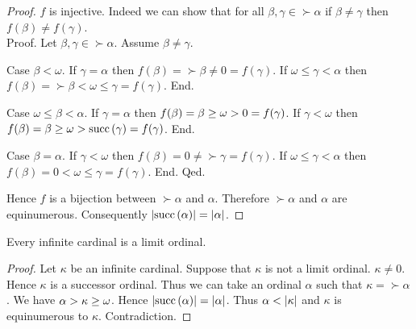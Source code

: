 \documentclass[../set-theory.tex]{subfiles}
\begin{document}
\begin{forthel}
\begin{proof}
      $f$ is injective.
      Indeed we can show that for all $\beta, \gamma \in \succ{\alpha}$ if
      $\beta \neq \gamma$ then $f(\beta) \neq f(\gamma)$. \\
      Proof.
        Let $\beta, \gamma \in \succ{\alpha}$.
        Assume $\beta \neq \gamma$.

        Case $\beta \less \omega$.
          If $\gamma = \alpha$ then
          $f(\beta)
            = \succ{\beta}
            \neq 0
            = f(\gamma)$.
          If $\omega \leq \gamma \less \alpha$ then
          $f(\beta)
            = \succ{\beta}
            \less \omega
            \leq \gamma
            = f(\gamma)$.
        End.

        Case $\omega \leq \beta \less \alpha$.
          If $\gamma = \alpha$ then
          $f(\beta)
            = \beta
            \geq \omega
            > 0
            = f(\gamma)$.
          If $\gamma \less \omega$ then
          $f(\beta)
            = \beta
            \geq \omega
            > \mathrm{succ}\left(\gamma\right)
            = f(\gamma)$.
        End.

        Case $\beta = \alpha$.
          If $\gamma \less \omega$ then
          $f(\beta)
            = 0
            \neq \succ{\gamma}
            = f(\gamma)$.
          If $\omega \leq \gamma \less \alpha$ then
          $f(\beta)
            = 0
            \less \omega
            \leq \gamma
            = f(\gamma)$.
        End.
      Qed.

      Hence $f$ is a bijection between $\succ{\alpha}$ and $\alpha$.
      Therefore $\succ{\alpha}$ and $\alpha$ are equinumerous.
      Consequently $\left\vert\mathrm{succ}\left(\alpha\right)\right\vert = \left\vert\alpha\right\vert$.
    \end{proof}
  \end{forthel}

  \begin{forthel}
    \begin{proposition}
      Every infinite cardinal is a limit ordinal.
    \end{proposition}
    \begin{proof}
      Let $\kappa$ be an infinite cardinal.
      Suppose that $\kappa$ is not a limit ordinal.
      $\kappa \neq 0$.
      Hence $\kappa$ is a successor ordinal.
      Thus we can take an ordinal $\alpha$ such that $\kappa = \succ{\alpha}$.
      We have $\alpha > \kappa \geq \omega$.
      Hence $\left\vert\mathrm{succ}\left(\alpha\right)\right\vert = \left\vert\alpha\right\vert$.
      Thus $\alpha < \left\vert\kappa\right\vert$ and $\kappa$ is equinumerous to $\kappa$.
      Contradiction.
    \end{proof}
  \end{forthel}
\end{document}
